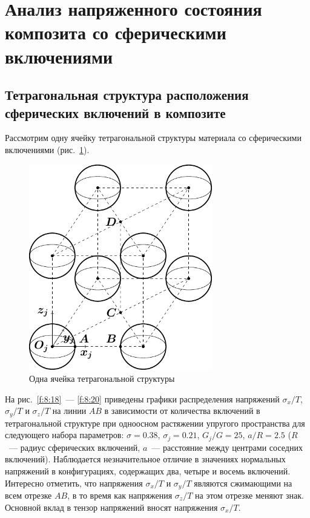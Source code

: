 \section{Анализ напряженного состояния композита со сферическими включениями}

\subsection{Тетрагональная структура расположения сферических включений в композите}

Рассмотрим одну ячейку тетрагональной структуры материала со сферическими включениями (рис.~\ref{f:8:52}).

\begin{figure}[h!]
\centering
\includegraphics[width=8cm]{spheres-cav-8.pdf}
\caption{Одна ячейка тетрагональной структуры}
\label{f:8:52}
\end{figure}

На рис.~\ref{f:8:18}~--- \ref{f:8:20} приведены графики распределения напряжений $\sigma_x/T$, $\sigma_y/T$ и $\sigma_z/T$ на линии $AB$ в зависимости от количества включений в тетрагональной структуре при одноосном растяжении упругого пространства для следующего набора параметров: $\sigma=0.38$, $\sigma_j=0.21$, $G_j/G=25$, $a/R=2.5$ ($R$~--- радиус сферических включений, $a$~--- расстояние между центрами соседних включений). Наблюдается незначительное отличие в значениях нормальных напряжений в конфигурациях, содержащих два, четыре и восемь включений. Интересно отметить, что напряжения $\sigma_x/T$ и $\sigma_y/T$ являются сжимающими на всем отрезке $AB$, в то время как напряжения $\sigma_z/T$ на этом отрезке меняют знак. Основной вклад в тензор напряжений вносят напряжения $\sigma_x/T$.

